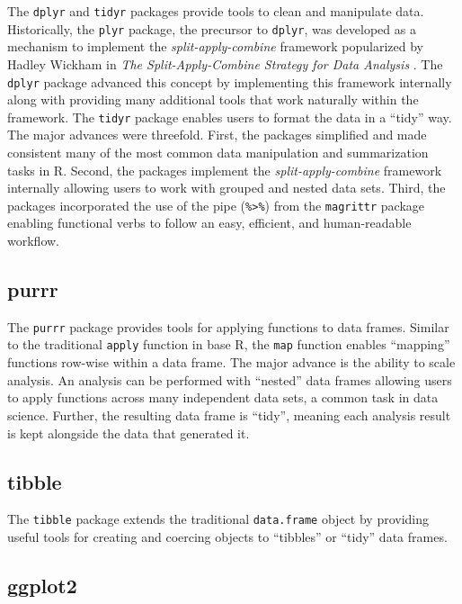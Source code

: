 The \texttt{dplyr} and \texttt{tidyr} packages provide tools to clean
and manipulate data. Historically, the \texttt{plyr} package, the
precursor to \texttt{dplyr}, was developed as a mechanism to implement
the \emph{split-apply-combine} framework popularized by Hadley Wickham
in \emph{The Split-Apply-Combine Strategy for Data Analysis}
\citep{plyr}. The \texttt{dplyr} package advanced this concept by
implementing this framework internally along with providing many
additional tools that work naturally within the framework. The
\texttt{tidyr} package enables users to format the data in a ``tidy''
way. The major advances were threefold. First, the packages simplified
and made consistent many of the most common data manipulation and
summarization tasks in R. Second, the packages implement the
\emph{split-apply-combine} framework internally allowing users to work
with grouped and nested data sets. Third, the packages incorporated the
use of the pipe (\texttt{\%\textgreater{}\%}) from the \texttt{magrittr}
package enabling functional verbs to follow an easy, efficient, and
human-readable workflow.

\subsection{purrr}\label{purrr}

The \texttt{purrr} package provides tools for applying functions to data
frames. Similar to the traditional \texttt{apply} function in base R,
the \texttt{map} function enables ``mapping'' functions row-wise within
a data frame. The major advance is the ability to scale analysis. An
analysis can be performed with ``nested'' data frames allowing users to
apply functions across many independent data sets, a common task in data
science. Further, the resulting data frame is ``tidy'', meaning each
analysis result is kept alongside the data that generated it.

\subsection{tibble}\label{tibble}

The \texttt{tibble} package extends the traditional \texttt{data.frame}
object by providing useful tools for creating and coercing objects to
``tibbles'' or ``tidy'' data frames.

\subsection{ggplot2}\label{ggplot2}

